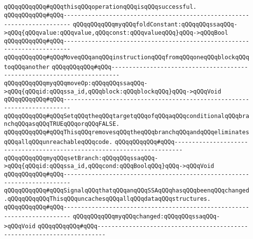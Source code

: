 \verb|qQQqqQQqqQQq#qQQqthisqQQqoperationqQQqisqQQqsuccessful.|\newline
\verb|qQQqqQQqqQQq#qQQq------------------------------------------------------------------------|\newline
\verb|qQQqqQQqqQQqmyqQQqfoldConstant:qQQqqQQqssaqQQq->qQQq{qQQqvalue:qQQqvalue,qQQqconst:qQQqvalueqQQq}qQQq->qQQqBool|\newline
\newline
\verb|qQQqqQQqqQQq#qQQq------------------------------------------------------------------------|\newline
\verb|qQQqqQQqqQQq#qQQqMoveqQQqanqQQqinstructionqQQqfromqQQqoneqQQqblockqQQqtoqQQqanother|\newline
\verb|qQQqqQQqqQQq#qQQq------------------------------------------------------------------------|\newline
\verb|qQQqqQQqqQQqmyqQQqmoveOp:qQQqqQQqssaqQQq->qQQq{qQQqid:qQQqssa_id,qQQqblock:qQQqblockqQQq}qQQq->qQQqVoid|\newline
\newline
\verb|qQQqqQQqqQQq#qQQq------------------------------------------------------------------------|\newline
\verb|qQQqqQQqqQQq#qQQqSetqQQqtheqQQqtargetqQQqofqQQqaqQQqconditionalqQQqbranchqQQqasqQQqTRUEqQQqorqQQqFALSE.|\newline
\verb|qQQqqQQqqQQq#qQQqThisqQQqremovesqQQqtheqQQqbranchqQQqandqQQqeliminatesqQQqallqQQqunreachableqQQqcode.|\newline
\verb|qQQqqQQqqQQq#qQQq------------------------------------------------------------------------|\newline
\verb|qQQqqQQqqQQqmyqQQqsetBranch:qQQqqQQqssaqQQq->qQQq{qQQqid:qQQqssa_id,qQQqcond:qQQqBoolqQQq}qQQq->qQQqVoid|\newline
\newline
\verb|qQQqqQQqqQQq#qQQq------------------------------------------------------------------------|\newline
\verb|qQQqqQQqqQQq#qQQqSignalqQQqthatqQQqanqQQqSSAqQQqhasqQQqbeenqQQqchanged.qQQqqQQqqQQqThisqQQquncachesqQQqallqQQqdataqQQqstructures.|\newline
\verb|qQQqqQQqqQQq#qQQq------------------------------------------------------------------------|\newline
\verb|qQQqqQQqqQQqmyqQQqchanged:qQQqqQQqssaqQQq->qQQqVoid|\newline
\newline
\verb|qQQqqQQqqQQq#qQQq------------------------------------------------------------------------|\newline
